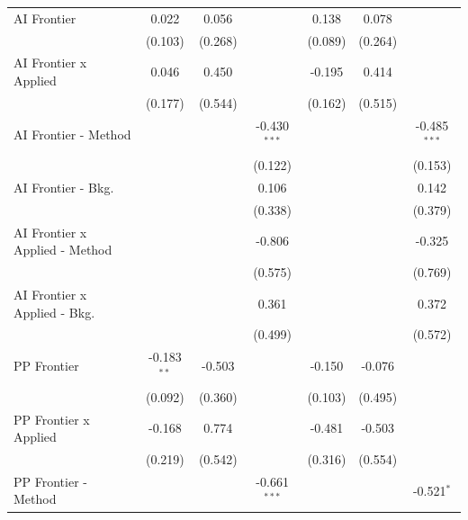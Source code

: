 \begin{tabular}{lcccccc}
   AI Frontier                    & 0.022         & 0.056          &                & 0.138        & 0.078   &   \\   
                                  & (0.103)       & (0.268)        &                & (0.089)      & (0.264) &   \\   
   AI Frontier x Applied          & 0.046         & 0.450          &                & -0.195       & 0.414   &   \\   
                                  & (0.177)       & (0.544)        &                & (0.162)      & (0.515) &   \\   
   AI Frontier - Method           &               &                & -0.430$^{***}$ &              &         & -0.485$^{***}$\\   
                                  &               &                & (0.122)        &              &         & (0.153)\\   
   AI Frontier - Bkg.             &               &                & 0.106          &              &         & 0.142\\   
                                  &               &                & (0.338)        &              &         & (0.379)\\   
   AI Frontier x Applied - Method &               &                & -0.806         &              &         & -0.325\\   
                                  &               &                & (0.575)        &              &         & (0.769)\\   
   AI Frontier x Applied - Bkg.   &               &                & 0.361          &              &         & 0.372\\   
                                  &               &                & (0.499)        &              &         & (0.572)\\   
   PP Frontier                    & -0.183$^{**}$ & -0.503         &                & -0.150       & -0.076  &   \\   
                                  & (0.092)       & (0.360)        &                & (0.103)      & (0.495) &   \\   
   PP Frontier x Applied          & -0.168        & 0.774          &                & -0.481       & -0.503  &   \\   
                                  & (0.219)       & (0.542)        &                & (0.316)      & (0.554) &   \\   
   PP Frontier - Method           &               &                & -0.661$^{***}$ &              &         & -0.521$^{*}$\\   

\end{tabular}
